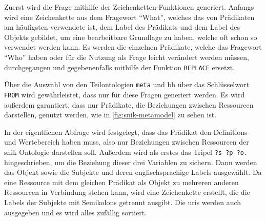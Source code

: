 Zuerst wird die Frage mithilfe der Zeichenketten-Funktionen generiert.
Anfangs wird eine Zeichenkette aus dem Fragewort \enquote{What}, welches das von Prädikaten am häufigsten verwendete ist, dem Label des Prädikats und dem Label des Objekts gebildet,
um eine bearbeitbare Grundlage zu haben, welche oft schon so verwendet werden kann.
Es werden die einzelnen Prädikate, welche das Fragewort \enquote{Who} haben oder für die Nutzung als Frage leicht verändert werden müssen,
durchgegangen und gegebenenfalls mithilfe der Funktion \texttt{REPLACE} ersetzt.

Über die Auswahl von den Teilontologien \texttt{meta} und {bb} über das Schlüsselwort \texttt{FROM} wird gewährleistet, dass nur für diese Fragen generiert werden.
Es wird außerdem garantiert, dass nur Prädikate, die Beziehungen zwischen Ressourcen darstellen, genutzt werden, wie in \cref{fig:snik-metamodel} zu sehen ist.

In der eigentlichen Abfrage wird festgelegt, dass das Prädikat den Definitions- und Wertebereich   haben muss, also nur Beziehungen zwischen Ressourcen der \ac{snik}-Ontologie darstellen soll.
Außerdem wird als erstes das Tripel \texttt{?s ?p ?o.} hingeschrieben, um die Beziehung dieser drei Variablen zu sichern.
Dann werden das Objekt sowie die Subjekte und deren englischsprachige Labels ausgewählt.
Da eine Ressource mit dem gleichen Prädikat als Objekt zu mehreren anderen Ressourcen in Verbindung stehen kann, wird eine Zeichenkette erstellt, die die Labels der Subjekte mit Semikolons getrennt ausgibt.
Die \acp{uri} werden auch ausgegeben und es wird alles zufällig sortiert.

